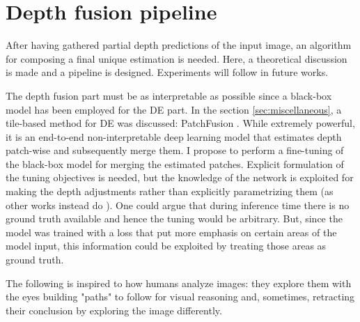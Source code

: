 \section{Depth fusion pipeline}
\label{sec:depth_fusion}
After having gathered partial depth predictions of the input image, an algorithm for composing a final unique estimation is needed.
Here, a theoretical discussion is made and a pipeline is designed.
Experiments will follow in future works.

The depth fusion part must be as interpretable as possible since a black-box model has been employed for the DE part.
In the section \ref{sec:miscellaneous}, a tile-based method for DE was discussed: PatchFusion \cite{PatchFusion}.
While extremely powerful, it is an end-to-end non-interpretable deep learning model that estimates depth patch-wise and subsequently merge them.
I propose to perform a fine-tuning of the black-box model for merging the estimated patches.
Explicit formulation of the tuning objectives is needed, but the knowledge of the network is exploited for making the depth adjustments rather than explicitly parametrizing them (as other works instead do \cite{konrad2, DepthTransfer, 360MonoDepth}).
One could argue that during inference time there is no ground truth available and hence the tuning would be arbitrary.
But, since the model was trained with a loss that put more emphasis on certain areas of the model input, this information could be exploited by treating those areas as ground truth.

The following is inspired to how humans analyze images: they explore them with the eyes building "paths" to follow for visual reasoning and, sometimes, retracting their conclusion by exploring the image differently.

\vspace{0.5cm}

